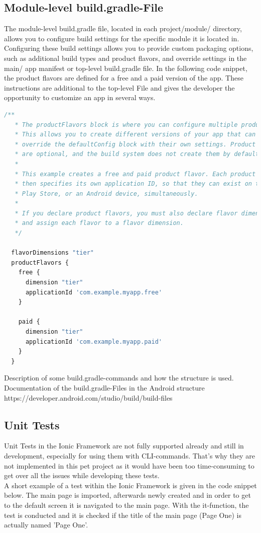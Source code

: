 \documentclass[12pt]{article}
\begin{document}
\subsection{Module-level build.gradle-File}

The module-level build.gradle file, located in each project/module/ directory, allows you to configure build settings for the specific module it is located in. Configuring these build settings allows you to provide custom packaging options, such as additional build types and product flavors, and override settings in the main/ app manifest or top-level build.gradle file. In the following code snippet, the product flavors are defined for a free and a paid version of the app. These instructions are additional to the top-level File and gives the developer the opportunity to customize an app in several ways.

\begin{lstlisting}[language=javascript]
 /**
   * The productFlavors block is where you can configure multiple product flavors.
   * This allows you to create different versions of your app that can
   * override the defaultConfig block with their own settings. Product flavors
   * are optional, and the build system does not create them by default.
   *
   * This example creates a free and paid product flavor. Each product flavor
   * then specifies its own application ID, so that they can exist on the Google
   * Play Store, or an Android device, simultaneously.
   *
   * If you declare product flavors, you must also declare flavor dimensions
   * and assign each flavor to a flavor dimension.
   */

  flavorDimensions "tier"
  productFlavors {
    free {
      dimension "tier"
      applicationId 'com.example.myapp.free'
    }

    paid {
      dimension "tier"
      applicationId 'com.example.myapp.paid'
    }
  }

\end{lstlisting}
Description of some build.gradle-commands and how the structure is used.\\
Documentation of the build.gradle-Files in the Android structure\\
https://developer.android.com/studio/build/build-files\\

\subsection{Unit Tests}
Unit Tests in the Ionic Framework are not fully supported already and still in development, especially for using them with CLI-commands. That's why they are not implemented in this pet project as it would have been too time-consuming to get over all the issues while developing these tests.\\
A short example of a test within the Ionic Framework is given in the code snippet below. The main page is imported, afterwards newly created and in order to get to the default screen it is navigated to the main page. With the it-function, the test is conducted and it is checked if the title of the main page (Page One) is actually named 'Page One'.
\end{document}
